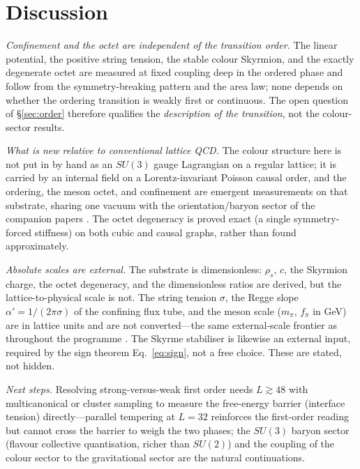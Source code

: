 \documentclass[aps,prd,reprint,nofootinbib,superscriptaddress,floatfix]{revtex4-2}
\begin{document}
\section{Discussion}\label{sec:discussion}

\emph{Confinement and the octet are independent of the transition order.} The linear
potential, the positive string tension, the stable colour Skyrmion, and the exactly
degenerate octet are measured at fixed coupling deep in the ordered phase and follow from
the symmetry-breaking pattern and the area law; none depends on whether the ordering
transition is weakly first or continuous. The open question of \S\ref{sec:order} therefore
qualifies the \emph{description of the transition}, not the colour-sector results.

\emph{What is new relative to conventional lattice QCD.} The colour structure here is not
put in by hand as an $SU(3)$ gauge Lagrangian on a regular lattice; it is carried by an
internal field on a Lorentz-invariant Poisson causal order, and the ordering, the meson
octet, and confinement are emergent measurements on that substrate, sharing one vacuum with
the orientation/baryon sector of the companion papers \cite{GoldstonePRD,MatterGravityPRD}. The octet
degeneracy is proved exact (a single symmetry-forced stiffness) on both cubic and causal
graphs, rather than found approximately.

\emph{Absolute scales are external.} The substrate is dimensionless: $\rho_s$, $c$, the
Skyrmion charge, the octet degeneracy, and the dimensionless ratios are derived, but the
lattice-to-physical scale is not. The string tension $\sigma$, the Regge slope
$\alpha'=1/(2\pi\sigma)$ of the confining flux tube, and the meson scale ($m_\pi$, $f_\pi$
in GeV) are in lattice units and are not converted---the same external-scale frontier as
throughout the programme \cite{TEICDoc1}. The Skyrme stabiliser is likewise an external
input, required by the sign theorem Eq.~\eqref{eq:sign}, not a free choice. These are
stated, not hidden.

\emph{Next steps.} Resolving strong-versus-weak first order needs $L\gtrsim48$ with
multicanonical or cluster sampling to measure the free-energy barrier (interface tension)
directly---parallel tempering at $L=32$ reinforces the first-order reading but cannot cross
the barrier to weigh the two phases; the $SU(3)$ baryon sector (flavour collective
quantisation, richer than $SU(2)$)
and the coupling of the colour sector to the gravitational sector are the natural
continuations.
\end{document}
